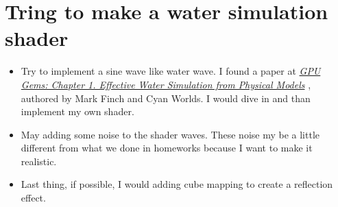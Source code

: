 \documentclass{article}
\begin{document}


\section*{Tring to make a water simulation shader}
\begin{itemize}
  \item Try to implement a sine wave like water wave. I found a paper at \href{https://developer.nvidia.com/content/gpu-gems-chapter-1-effective-water-simulation-physical-models}{\textit{GPU Gems: Chapter 1. Effective Water Simulation from Physical Models}} , authored by Mark Finch and Cyan Worlds. I would dive in and than implement my own shader. 
  \item May adding some noise to the shader waves. These noise my be a little different from what we done in homeworks because I want to make it realistic.
  \item Last thing, if possible, I would adding cube mapping to create a reflection effect.
\end{itemize}
\end{document}
